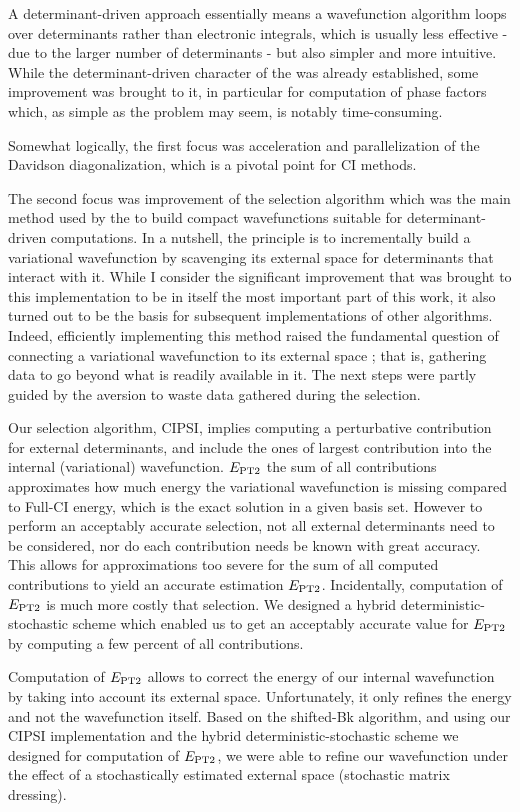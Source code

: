 \documentclass[12pt,a4paper]{report}
\begin{document}
A determinant-driven approach essentially means a wavefunction algorithm loops over determinants rather than electronic integrals, which is usually less effective - due to the larger number of determinants - but also simpler and more intuitive. While the determinant-driven character of the \QP was already established, some improvement was brought to it, in particular for computation of phase factors which, as simple as the problem may seem, is notably time-consuming.

Somewhat logically, the first focus was acceleration and parallelization of the Davidson diagonalization, which is a pivotal point for CI methods.

The second focus was improvement of the selection algorithm which was the main method used by the \QP to build compact wavefunctions suitable for determinant-driven computations. In a nutshell, the principle is to incrementally build a variational wavefunction by scavenging its external space for determinants that interact with it. While I consider the significant improvement that was brought to this implementation to be in itself the most important part of this work, it also turned out to be the basis for subsequent implementations of other algorithms. Indeed, efficiently implementing this method raised the fundamental question of connecting a variational wavefunction to its external space ; that is, gathering data to go beyond what is readily available in it. The next steps were partly guided by the aversion to waste data gathered during the selection.

Our selection algorithm, CIPSI, implies computing a perturbative contribution for external determinants, and include the ones of largest contribution into the internal (variational) wavefunction. $E_\text{PT2}$ the sum of all contributions approximates how much energy the variational wavefunction is missing compared to Full-CI energy, which is the exact solution in a given basis set. However to perform an acceptably accurate selection, not all external determinants need to be considered, nor do each contribution needs be known with great accuracy. This allows for approximations too severe for the sum of all computed contributions to yield an accurate estimation $E_\text{PT2}$. Incidentally, computation of $E_\text{PT2}$ is much more costly that selection. We designed a hybrid deterministic-stochastic scheme which enabled us to get an acceptably accurate value for $E_\text{PT2}$ by computing a few percent of all contributions.

Computation of $E_\text{PT2}$ allows to correct the energy of our internal wavefunction by taking into account its external space. Unfortunately, it only refines the energy and not the wavefunction itself. Based on the shifted-Bk algorithm, and using our CIPSI implementation and the hybrid deterministic-stochastic scheme we designed for computation of $E_\text{PT2}$, we were able to refine our wavefunction under the effect of a stochastically estimated external space (stochastic matrix dressing).
\end{document}
